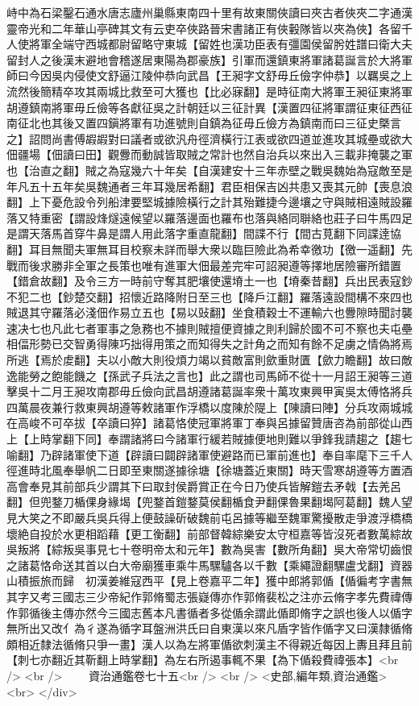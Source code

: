 峙中為石梁鑿石通水唐志廬州巢縣東南四十里有故東關俠讀曰夾古者俠夾二字通漢靈帝光和二年華山亭碑其文有云吏卒俠路晉宋書諸正有俠轂隊皆以夾為俠】各留千人使將軍全端守西城都尉留略守東城【留姓也漢功臣表有彊園侯留肹姓譜曰衛大夫留封人之後漢末避地會稽遂居東陽為郡豪族】引軍而還鎮東將軍諸葛誕言於大將軍師曰今因吳内侵使文舒逼江陵仲恭向武昌【王昶字文舒毋丘儉字仲恭】以羈吳之上流然後簡精卒攻其兩城比救至可大獲也【比必寐翻】是時征南大將軍王昶征東將軍胡遵鎮南將軍毋丘儉等各獻征吳之計朝廷以三征計異【漢置四征將軍謂征東征西征南征北也其後又置四鎭將軍有功進號則自鎮為征毋丘儉方為鎮南而曰三征史槩言之】詔問尚書傅嘏嘏對曰議者或欲汎舟徑濟橫行江表或欲四道並進攻其城壘或欲大佃疆場【佃讀曰田】觀釁而動誠皆取賊之常計也然自治兵以來出入三載非掩襲之軍也【治直之翻】賊之為寇幾六十年矣【自漢建安十三年赤壁之戰吳魏始為寇敵至是年凡五十五年矣吳魏通者三年耳幾居希翻】君臣相保吉凶共患又喪其元帥【喪息浪翻】上下憂危設令列船津要堅城據險橫行之計其殆難捷今邊壤之守與賊相遠賊設羅落又特重密【謂設烽燧遠候望以羅落邊面也羅布也落與絡同聨絡也莊子曰牛馬四足是謂天落馬首穿牛鼻是謂人用此落字重直龍翻】間諜不行【間古莧翻下同諜逹協翻】耳目無聞夫軍無耳目校察未詳而舉大衆以臨巨險此為希幸徼功【徼一遥翻】先戰而後求勝非全軍之長策也唯有進軍大佃最差完牢可詔昶遵等擇地居險審所錯置【錯倉故翻】及令三方一時前守奪其肥壤使還塉土一也【塉秦昔翻】兵出民表寇鈔不犯二也【鈔楚交翻】招懷近路降附日至三也【降戶江翻】羅落遠設間構不來四也賊退其守羅落必淺佃作易立五也【易以䜴翻】坐食積穀士不運輸六也釁隙時聞討襲速决七也凡此七者軍事之急務也不據則賊擅便資據之則利歸於國不可不察也夫屯壘相偪形勢已交智勇得陳巧拙得用策之而知得失之計角之而知有餘不足虜之情偽將焉所逃【焉於䖍翻】夫以小敵大則役煩力竭以貧敵富則歛重財匱【歛力瞻翻】故曰敵逸能勞之飽能饑之【孫武子兵法之言也】此之謂也司馬師不從十一月詔王昶等三道擊吳十二月王昶攻南郡毋丘儉向武昌胡遵諸葛誕率衆十萬攻東興甲寅吳太傅恪將兵四萬晨夜兼行救東興胡遵等敕諸軍作浮橋以度陳於隄上【陳讀曰陣】分兵攻兩城城在高峻不可卒拔【卒讀曰猝】諸葛恪使冠軍將軍丁奉與呂據留贊唐咨為前部從山西上【上時掌翻下同】奉謂諸將曰今諸軍行緩若賊據便地則難以爭鋒我請趨之【趨七喻翻】乃辟諸軍使下道【辟讀曰闢辟諸軍使避路而已軍前進也】奉自率麾下三千人徑進時北風奉舉帆二日即至東關遂據徐塘【徐塘蓋近東關】時天雪寒胡遵等方置酒高會奉見其前部兵少謂其下曰取封侯爵賞正在今日乃使兵皆解鎧去矛戟【去羌呂翻】但兜鍪刀楯倮身緣堨【兜鍪首鎧鍪莫侯翻楯食尹翻倮魯果翻堨阿葛翻】魏人望見大笑之不即嚴兵吳兵得上便鼓譟斫破魏前屯呂據等繼至魏軍驚擾散走爭渡浮橋橋壞絶自投於水更相蹈藉【更工衡翻】前部督韓綜樂安太守桓嘉等皆沒死者數萬綜故吳叛將【綜叛吳事見七十卷明帝太和元年】數為吳害【數所角翻】吳大帝常切齒恨之諸葛恪命送其首以白大帝廟獲車乘牛馬騾驢各以千數【乘繩證翻騾盧戈翻】資器山積振旅而歸　初漢姜維寇西平【見上卷嘉平二年】獲中郎將郭偱【偱徧考字書無其字又考三國志三少帝紀作郭脩蜀志張嶷傳亦作郭脩裴松之注亦云脩字孝先費禕傳作郭循後主傳亦然今三國志舊本凡書循者多從偱余謂此偱即脩字之誤也後人以偱字無所出又改亻為彳遂為循字耳盤洲洪氏曰自東漢以來凡盾字皆作偱字又曰漢隸循脩頗相近隸法循脩只爭一畫】漢人以為左將軍偱欲刺漢主不得親近每因上夀且拜且前【刺七亦翻近其靳翻上時掌翻】為左右所遏事輒不果【為下偱殺費禕張本】<br />
<br />
　　資治通鑑卷七十五<br />
<br />
<史部,編年類,資治通鑑>  <br>
   </div> 

